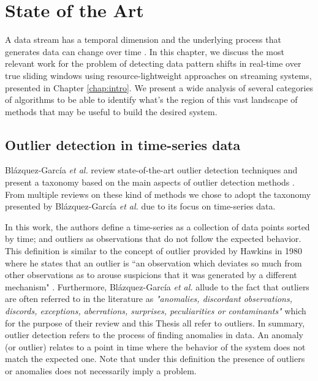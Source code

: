 \chapter{State of the Art} \label{chap:sota} \minitoc

A data stream has a temporal dimension and the underlying process that generates data can change over time \cite{Aggarwal-Evolving-Data-Streams, Domingos-Mining-Time-Data-Streams}. In this chapter, we discuss the most relevant work for the problem of detecting data pattern shifts in real-time over true sliding windows using resource-lightweight approaches on streaming systems, presented in Chapter \ref{chap:intro}. We present a wide analysis of several categories of algorithms to be able to identify what's the region of this vast landscape of methods that may be useful to build the desired system. 

\section{Outlier detection in time-series data} \label{sec:outliers}
Blázquez-García \emph{et al.} review state-of-the-art outlier detection techniques and present a taxonomy based on the main aspects of outlier detection methods \cite{Blazquez-Garcia-Review-Anomaly-Detection}. From multiple reviews on these kind of methods \cite{Aggarwal-Outlier-survey, Aguinis-Outlier-survey, Chandola-Outlier-survey-2009, Hodge-Outlier-survey, Xu-outlier-survey-2019} we chose to adopt the taxonomy presented by Blázquez-García \emph{et al.} due to its focus on time-series data.

In this work, the authors define a time-series as a collection of data points sorted by time; and outliers as observations that do not follow the expected behavior. This definition is similar to the concept of outlier provided by Hawkins in 1980 where he states that an outlier is “an observation which deviates so much from other observations as to arouse suspicions that it was
generated by a different mechanism" \cite{Hawkins-Outliers}. Furthermore, Blázquez-García \emph{et al.} allude to the fact that outliers are often referred to in the literature as \textit{"anomalies, discordant observations, discords, exceptions, aberrations, surprises, peculiarities or contaminants"} which for the purpose of their review and this Thesis all refer to outliers. In summary, outlier detection refers to the process of finding anomalies in data. An anomaly (or outlier) relates to a point in time where the behavior of the system does not match the expected one. Note that under this definition the presence of outliers or anomalies does not necessarily imply a problem. 

